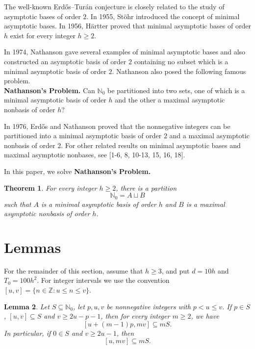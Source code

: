 \documentclass[reqno,12pt,twoside]{article}
\numberwithin{equation}{section}
\newtheorem{theorem}{Theorem}[section]
\newtheorem{lemma}[theorem]{Lemma}
\newcommand{\Nzero}{\mathbb N_0}
\begin{document}
The well-known Erd\H{o}s--Tur\'an conjecture \cite{ErdosTuran1941} is closely related to the study of asymptotic bases of order $2$. In 1955, St\"ohr \cite{Stohr1955} introduced the concept of minimal asymptotic bases. In 1956, H\"artter \cite{Hartter1956} proved that minimal asymptotic bases of order $h$ exist for every integer $h\ge2$.

In 1974, Nathanson \cite{Nathanson1974} gave several examples of minimal asymptotic bases and also constructed an asymptotic basis of order $2$ containing no subset which is a minimal asymptotic basis of order $2$. Nathanson \cite{Nathanson1974} also posed the following famous problem.\\
{\bf Nathanson's Problem.}
Can $\Nzero$ be partitioned into two sets, one of which is a minimal asymptotic basis of order $h$ and the other a maximal asymptotic nonbasis of order $h$?

In 1976, Erd\H{o}s and Nathanson \cite{ErdosNathanson1976} proved that the nonnegative integers can be partitioned into a minimal asymptotic basis of order $2$ and a maximal asymptotic nonbasis of order $2$. For other related results on minimal asymptotic bases and maximal asymptotic nonbases, see [1-6, 8, 10-13, 15, 16, 18].

In this paper, we solve {\bf Nathanson's Problem.}

\begin{theorem}\label{thm1}
For every integer $h\ge2$, there is a partition
\[
 \Nzero=A\sqcup B
\]
such that $A$ is a minimal asymptotic basis of order $h$ and $B$ is a maximal asymptotic nonbasis of order $h$.
\end{theorem}

\section{Lemmas}

For the remainder of this section, assume that $h\ge3$, and put $d=10h$ and $T_0=100h^2$.
For integer intervals we use the convention $[u,v]=\{n\in\mathbb Z:u\le n\le v\}$. 

\begin{lemma}\label{lem1}
Let $S\subseteq\Nzero$, let $p,u,v$ be nonnegative integers with $p<u\le v$. If $p\in S$, $[u,v]\subseteq S$ and $v\ge 2u-p-1$,
then for every integer $m\ge2$, we have
\[
 [u+(m-1)p,mv]\subseteq mS.
\]
In particular, if $0\in S$ and $v\ge2u-1$, then
\[
 [u,mv]\subseteq mS.
\]
\end{lemma}
\end{document}
